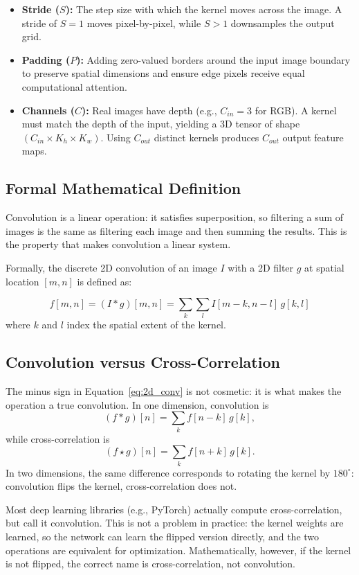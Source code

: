 \begin{itemize}[leftmargin=*]
    \item \textbf{Stride ($S$):} The step size with which the kernel moves across the image. A stride of $S=1$ moves pixel-by-pixel, while $S > 1$ downsamples the output grid.
    \item \textbf{Padding ($P$):} Adding zero-valued borders around the input image boundary to preserve spatial dimensions and ensure edge pixels receive equal computational attention.
    \item \textbf{Channels ($C$):} Real images have depth (e.g., $C_{in} = 3$ for RGB). A kernel must match the depth of the input, yielding a 3D tensor of shape $(C_{in} \times K_h \times K_w)$. Using $C_{out}$ distinct kernels produces $C_{out}$ output feature maps.
\end{itemize}

\subsection{Formal Mathematical Definition}

Convolution is a linear operation: it satisfies superposition, so filtering a sum of images is the same as filtering each image and then summing the results. This is the property that makes convolution a linear system.

Formally, the discrete 2D convolution of an image $I$ with a 2D filter $g$ at spatial location $[m, n]$ is defined as:

\begin{equation}
f[m, n] = (I * g)[m, n] = \sum_{k} \sum_{l} I[m - k, n - l] \, g[k, l]
\label{eq:2d_conv}
\end{equation}
where $k$ and $l$ index the spatial extent of the kernel.

\subsection{Convolution versus Cross-Correlation}
The minus sign in Equation~\ref{eq:2d_conv} is not cosmetic: it is what makes the operation a true convolution. In one dimension, convolution is
\[ (f * g)[n] = \sum_k f[n-k]\,g[k], \]
while cross-correlation is
\[ (f \star g)[n] = \sum_k f[n+k]\,g[k]. \]
In two dimensions, the same difference corresponds to rotating the kernel by $180^\circ$: convolution flips the kernel, cross-correlation does not.

Most deep learning libraries (e.g., PyTorch) actually compute cross-correlation, but call it convolution. This is not a problem in practice: the kernel weights are learned, so the network can learn the flipped version directly, and the two operations are equivalent for optimization. Mathematically, however, if the kernel is not flipped, the correct name is cross-correlation, not convolution.

